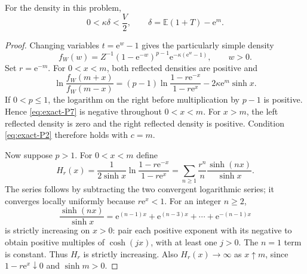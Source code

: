 \begin{proposition}\label{prop:exact-P3} For the density in this problem,
\begin{equation}
 0<\kappa\delta<\frac V2,
 \qquad \delta=\mathbb{E}(1+T)-\mathrm{e}^m.                       \label{eq:exact-P5}
\end{equation}

\end{proposition}
\begin{proof} Changing variables \(t=\mathrm{e}^w-1\) gives the particularly simple density
\begin{equation}
 f_W(w)=Z^{-1}(1-\mathrm{e}^{-w})^{p-1}
                  \mathrm{e}^{-\kappa(\mathrm{e}^w-1)},\qquad w>0.     \label{eq:exact-P6}
\end{equation}
Set \(r=\mathrm{e}^{-m}\). For \(0<x<m\), both reflected densities are positive and
\begin{equation}
 \ln\frac{f_W(m+x)}{f_W(m-x)}
 =(p-1)\ln\frac{1-r \mathrm{e}^{-x}}{1-r \mathrm{e}^x}
       -2\kappa \mathrm{e}^m\sinh x.                         \label{eq:exact-P7}
\end{equation}
If \(0<p\le1\), the logarithm on the right before multiplication by \(p-1\) is positive. Hence \eqref{eq:exact-P7} is negative throughout \(0<x<m\). For \(x>m\), the left reflected density is zero and the right reflected density is positive. Condition \eqref{eq:exact-P2} therefore holds with \(c=m\).

Now suppose \(p>1\). For \(0<x<m\) define
\begin{equation}
 H_r(x)=\frac{1}{2\sinh x}
          \ln\frac{1-r \mathrm{e}^{-x}}{1-r \mathrm{e}^x}
       =\sum_{n\ge1}\frac{r^n}{n}
                    \frac{\sinh(nx)}{\sinh x}.        \label{eq:exact-P8}
\end{equation}
The series follows by subtracting the two convergent logarithmic series; it converges locally uniformly because \(r \mathrm{e}^x<1\). For an integer \(n\ge2\),
\begin{equation}
 \frac{\sinh(nx)}{\sinh x}
   =\mathrm{e}^{(n-1)x}+\mathrm{e}^{(n-3)x}+\cdots+\mathrm{e}^{-(n-1)x}
\end{equation}
is strictly increasing on \(x>0\): pair each positive exponent with its negative to obtain positive multiples of \(\cosh(jx)\), with at least one \(j>0\). The \(n=1\) term is constant. Thus \(H_r\) is strictly increasing. Also \(H_r(x)\to\infty\) as \(x\uparrow m\), since \(1-r \mathrm{e}^x\downarrow0\) and \(\sinh m>0\).


\end{proof}
